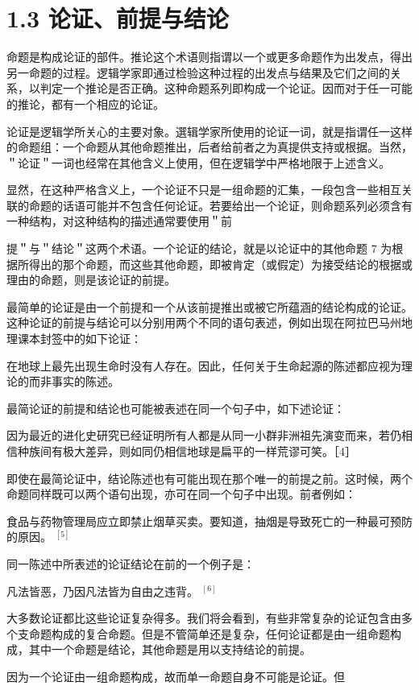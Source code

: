\section*{1.3 论证、前提与结论}
命题是构成论证的部件。推论这个术语则指谓以一个或更多命题作为出发点，得出另一命题的过程。逻辑学家即通过检验这种过程的出发点与结果及它们之间的关系，以判定一个推论是否正确。这种命题系列即构成一个论证。因而对于任一可能的推论，都有一个相应的论证。

论证是逻辑学所关心的主要对象。選辑学家所使用的论证一词，就是指谓任一这样的命题组：一个命题从其他命题推出，后者给前者之为真提供支持或根据。当然，＂论证＂一词也经常在其他含义上使用，但在逻辑学中严格地限于上述含义。

显然，在这种严格含义上，一个论证不只是一组命题的汇集，一段包含一些相互关联的命题的话语可能并不包含任何论证。若要给出一个论证，则命题系列必须含有一种结构，对这种结构的描述通常要使用＂前

提＂与＂结论＂这两个术语。一个论证的结论，就是以论证中的其他命题 7 为根据所得出的那个命题，而这些其他命题，即被肯定（或假定）为接受结论的根据或理由的命题，则是该论证的前提。

最简单的论证是由一个前提和一个从该前提推出或被它所蕴涵的结论构成的论证。这种论证的前提与结论可以分别用两个不同的语句表述，例如出现在阿拉巴马州地理课本封签中的如下论证：

在地球上最先出现生命时没有人存在。因此，任何关于生命起源的陈述都应视为理论的而非事实的陈述。

最简论证的前提和结论也可能被表述在同一个句子中，如下述论证：

因为最近的进化史研究已经证明所有人都是从同一小群非洲祖先演变而来，若仍相信种族间有极大差异，则如同仍相信地球是扁平的一样荒谬可笑。［4］

即使在最简论证中，结论陈述也有可能出现在那个唯一的前提之前。这时候，两个命题同样既可以两个语句出现，亦可在同一个句子中出现。前者例如：

食品与药物管理局应立即禁止烟草买卖。要知道，抽烟是导致死亡的一种最可预防的原因。 ${}^{[5]}$

同一陈述中所表述的论证结论在前的一个例子是：

凡法皆恶，乃因凡法皆为自由之违背。 ${ }^{[6]}$

大多数论证都比这些论证复杂得多。我们将会看到，有些非常复杂的论证包含由多个支命题构成的复合命题。但是不管简单还是复杂，任何论证都是由一组命题构成，其中一个命题是结论，其他命题是用以支持结论的前提。

因为一个论证由一组命题构成，故而单一命题自身不可能是论证。但

